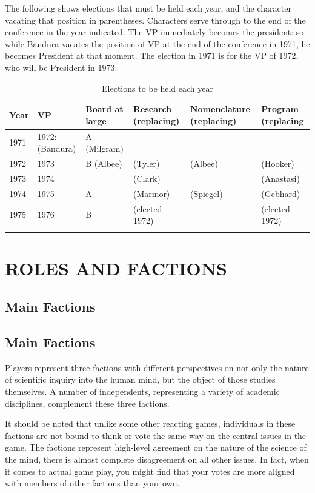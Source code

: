 The following shows elections that must be held each year, and the character vacating that position in parentheses. Characters serve through to the end of the conference in the year indicated. The VP immediately becomes the president: so while Bandura vacates the position of VP at the end of the conference in 1971, he becomes President at that moment. The election in 1971 is for the VP of 1972, who will be President in 1973.
 \begin{longtable}[!t]{ | p{1cm} | p{2cm} | p{2cm} | p{2cm} | p{2cm} | p{2cm} | }
\hline
\textbf{Year}&\textbf{VP}&\textbf{Board at large}&\textbf{Research (replacing)}&\textbf{Nomenclature (replacing)}&\textbf{Program (replacing} \\ \hline

1971& 1972: (Bandura)&A (Milgram)& & & \\
1972&1973&B (Albee)&(Tyler)&(Albee)&(Hooker) \\
1973&1974& &(Clark)& &(Anastasi)\\
1974&1975&A&(Marmor)&(Spiegel)&(Gebhard) \\
1975&1976&B&(elected 1972)& &(elected 1972) \\ \hline
\caption{Elections to be held each year}
\label{table: boardMembership}
\end{longtable}

\pagebreak 

\chapter{ROLES AND FACTIONS}
\label{rolesandfactions}

\section{Main Factions}
\label{mainfactions}

\section{Main Factions}
\label{mainfactions}

Players represent three factions with different perspectives on not only the nature of scientific inquiry into the human mind, but the object of those studies themselves. A number of independents, representing a variety of academic disciplines, complement these three factions.

It should be noted that unlike some other reacting games, individuals in these factions are not bound to think or vote the same way on the central issues in the game. The factions represent high-level agreement on the nature of the science of the mind, there is almost complete disagreement on all other issues. In fact, when it comes to actual game play, you might find that your votes are more aligned with members of other factions than your own.

